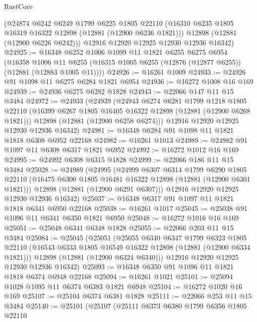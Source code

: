\begin{lexlean}{RustCore}
\begin{coremodule}
      (@24874
        @6242
        @6249
        @1799
        @6225
        @1805
        @22110
        (@16310 @6235 @1805 @16319 @16322 @12898 (@12881 (@12900 @6236 @1821)))
        @12898
        (@12881 (@12900 @6226 @6242)))
      @12916
      @12920
      @12925
      @12930
      @12936
      @16342)
@24925 := @16348
    @6252
    @1006
    @1099
    @11
    @1821
    @6255
    @6275
    @6954
    (@16358
      @1006
      @11
      @6255
      (@16315 @1005 @6255 (@12876 (@12877 @6255)) (@12881 (@12883 @1005 @11))))
@24926 := @16261 @1009
@24933 := @24926 @91 @1098 @11 @6275 @6284 @1821 @6954
@24936 := @16272 @1008 @16 @169
@24939 := @24936 @6275 @6282 @1828
@24943 := @22066 @147 @11 @15 @3484
@24972 := @24933
    (@24939
      (@24943
        @6274
        @6281
        @1799
        @1218
        @1805
        @22110
        (@16399 @6267 @1805 @16405 @16322 @12898 (@12881 (@12900 @6268 @1821)))
        @12898
        (@12881 (@12900 @6258 @6274)))
      @12916
      @12920
      @12925
      @12930
      @12936
      @16342)
@24981 := @16348 @6284 @91 @1098 @11 @1821 @1818 @6308 @6952 @22168
@24982 := @16261 @1013
@24989 := @24982 @91 @1097 @11 @6308 @6317 @1821 @6952
@24992 := @16272 @1012 @16 @169
@24995 := @24992 @6308 @6315 @1828
@24999 := @22066 @186 @11 @15 @3484
@25028 := @24989
    (@24995
      (@24999
        @6307
        @6314
        @1799
        @6290
        @1805
        @22110
        (@16475 @6300 @1805 @16481 @16322 @12898 (@12881 (@12900 @6301 @1821)))
        @12898
        (@12881 (@12900 @6291 @6307)))
      @12916
      @12920
      @12925
      @12930
      @12936
      @16342)
@25037 := @16348 @6317 @91 @1097 @11 @1821 @1818 @6341 @6950 @22168
@25038 := @16261 @1017
@25045 := @25038 @91 @1096 @11 @6341 @6350 @1821 @6950
@25048 := @16272 @1016 @16 @169
@25051 := @25048 @6341 @6348 @1828
@25055 := @22066 @203 @11 @15 @3484
@25084 := @25045
    (@25051
      (@25055
        @6340
        @6347
        @1799
        @6323
        @1805
        @22110
        (@16543 @6333 @1805 @16549 @16322 @12898 (@12881 (@12900 @6334 @1821)))
        @12898
        (@12881 (@12900 @6324 @6340)))
      @12916
      @12920
      @12925
      @12930
      @12936
      @16342)
@25093 := @16348 @6350 @91 @1096 @11 @1821 @1818 @6374 @6948 @22168
@25094 := @16261 @1021
@25101 := @25094 @1028 @1095 @11 @6374 @6383 @1821 @6948
@25104 := @16272 @1020 @16 @169
@25107 := @25104 @6374 @6381 @1828
@25111 := @22066 @253 @11 @15 @3484
@25140 := @25101
    (@25107
      (@25111
        @6373
        @6380
        @1799
        @6356
        @1805
        @22110

\end{coremodule}
\end{lexlean}
